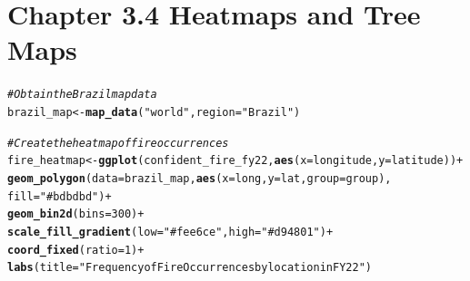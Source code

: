 \documentclass{article}\usepackage[]{graphicx}\usepackage[]{xcolor}
\makeatletter
\newcommand{\hlnum}[1]{\textcolor[rgb]{0.686,0.059,0.569}{#1}}%
\newcommand{\hlstr}[1]{\textcolor[rgb]{0.192,0.494,0.8}{#1}}%
\newcommand{\hlcom}[1]{\textcolor[rgb]{0.678,0.584,0.686}{\textit{#1}}}%
\newcommand{\hlopt}[1]{\textcolor[rgb]{0,0,0}{#1}}%
\newcommand{\hlstd}[1]{\textcolor[rgb]{0.345,0.345,0.345}{#1}}%
\newcommand{\hlkwb}[1]{\textcolor[rgb]{0.69,0.353,0.396}{#1}}%
\newcommand{\hlkwc}[1]{\textcolor[rgb]{0.333,0.667,0.333}{#1}}%
\newcommand{\hlkwd}[1]{\textcolor[rgb]{0.737,0.353,0.396}{\textbf{#1}}}%
\newenvironment{kframe}{%
 \def\at@end@of@kframe{}%
 \ifinner\ifhmode%
  \def\at@end@of@kframe{\end{minipage}}%
  \begin{minipage}{\columnwidth}%
 \fi\fi%
 \def\FrameCommand##1{\hskip\@totalleftmargin \hskip-\fboxsep
 \colorbox{shadecolor}{##1}\hskip-\fboxsep
     \hskip-\linewidth \hskip-\@totalleftmargin \hskip\columnwidth}%
 \MakeFramed {\advance\hsize-\width
   \@totalleftmargin\z@ \linewidth\hsize
   \@setminipage}}%
 {\par\unskip\endMakeFramed%
 \at@end@of@kframe}
\newenvironment{knitrout}{}{} %
\makeatother
\begin{document}
\section{Chapter 3.4 Heatmaps and Tree Maps}






\begin{knitrout}
\color{fgcolor}\begin{kframe}
\begin{alltt}
\hlcom{# Obtain the Brazil map data}
\hlstd{brazil_map} \hlkwb{<-} \hlkwd{map_data}\hlstd{(}\hlstr{"world"}\hlstd{,} \hlkwc{region} \hlstd{=} \hlstr{"Brazil"}\hlstd{)}

\hlcom{# Create the heatmap of fire occurrences}
\hlstd{fire_heatmap} \hlkwb{<-} \hlkwd{ggplot}\hlstd{(confident_fire_fy22,} \hlkwd{aes}\hlstd{(}\hlkwc{x} \hlstd{= longitude,} \hlkwc{y} \hlstd{= latitude))} \hlopt{+}
  \hlkwd{geom_polygon}\hlstd{(}\hlkwc{data} \hlstd{= brazil_map,} \hlkwd{aes}\hlstd{(}\hlkwc{x} \hlstd{= long,} \hlkwc{y} \hlstd{= lat,} \hlkwc{group} \hlstd{= group),}
               \hlkwc{fill} \hlstd{=} \hlstr{"#bdbdbd"}\hlstd{)} \hlopt{+}
  \hlkwd{geom_bin2d}\hlstd{(}\hlkwc{bins} \hlstd{=} \hlnum{300}\hlstd{)} \hlopt{+}
  \hlkwd{scale_fill_gradient}\hlstd{(}\hlkwc{low} \hlstd{=} \hlstr{"#fee6ce"}\hlstd{,} \hlkwc{high} \hlstd{=} \hlstr{"#d94801"}\hlstd{)} \hlopt{+}
  \hlkwd{coord_fixed}\hlstd{(}\hlkwc{ratio} \hlstd{=} \hlnum{1}\hlstd{)} \hlopt{+}
  \hlkwd{labs}\hlstd{(}\hlkwc{title} \hlstd{=} \hlstr{"Frequency of Fire Occurrences by location in FY22"}\hlstd{)}


\end{alltt}
\end{kframe}
\end{knitrout}
\end{document}
